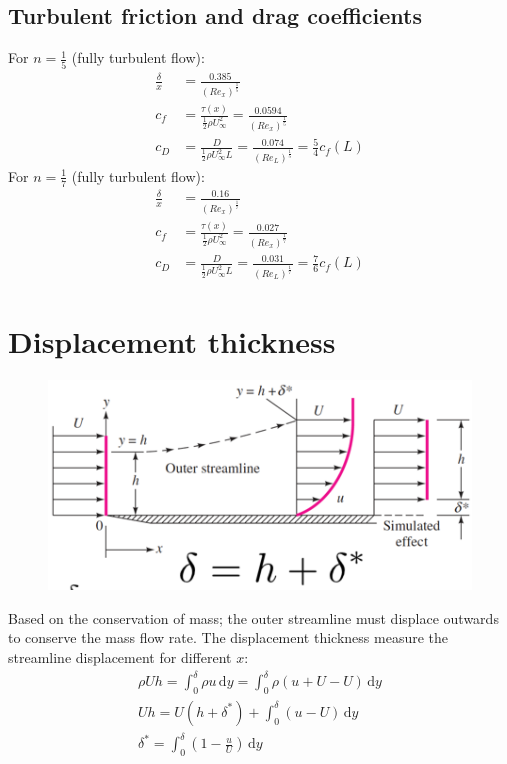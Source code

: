 \documentclass[class=report, crop=false, 12pt,a4paper]{standalone}
\begin{document}
\subsection{Turbulent friction and drag coefficients}
For $n = \frac{1}{5}$ (fully turbulent flow):
\begin{align}
  \frac{\delta}{x} &= \frac{0.385}{(Re_x)^{\frac{1}{5}}}\\
  c_f &= \frac{\tau (x)}{\frac{1}{2}\rho U_\infty^2} = \frac{0.0594}{(Re_x)^\frac{1}{5}}\\
  c_D &= \frac{D}{\frac{1}{2} \rho U_\infty^2 L} = \frac{0.074}{(Re_L)^{\frac{1}{5}}} = \frac{5}{4} c_f (L)
\end{align}
For $n = \frac{1}{7}$ (fully turbulent flow):
\begin{align}
  \frac{\delta}{x} &= \frac{0.16}{(Re_x)^{\frac{1}{7}}}\\
  c_f &= \frac{\tau (x)}{\frac{1}{2} \rho U_\infty^2} = \frac{0.027}{(Re_x)^{\frac{1}{7}}}\\
  c_D &= \frac{D}{\frac{1}{2}\rho U_\infty^2 L} = \frac{0.031}{(Re_L)^{\frac{1}{7}}} = \frac{7}{6} c_f (L)
\end{align}
\section{Displacement thickness}
\begin{figure}[H]
  \centering
  \includegraphics[width = 0.8 \textwidth]{../img/diagram72.png}
  \caption{}
\end{figure}
Based on the conservation of mass; the outer streamline must displace outwards to conserve the mass flow rate. The displacement thickness measure the streamline displacement for different $x$:
\begin{gather}
  \rho U h = \int_{0}^{\delta} \rho u \,\mathrm{d}y = \int_{0}^{\delta} \rho \left(u + U - U\right) \,\mathrm{d}y\\
  Uh = U(h + \delta^*) + \int_{0}^{\delta} \left(u - U\right) \,\mathrm{d}y\\
  \delta^* = \int_{0}^{\delta} \left(1 - \frac{u}{U}\right) \,\mathrm{d}y
\end{gather}
\end{document}
